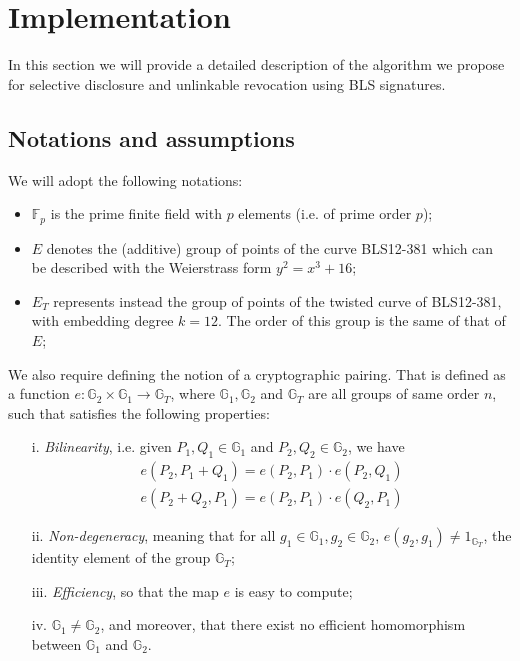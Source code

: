 \section{Implementation}

In this section we will provide a detailed description of the algorithm we propose for selective disclosure and unlinkable revocation using BLS signatures.

\subsection{Notations and assumptions}

We will adopt the following notations:
\begin{itemize}

\item $\mathbb{F}_p$ is the prime finite field with $p$ elements
  (i.e. of prime order $p$);

\item $E$ denotes the (additive) group of points of the curve
  BLS12-381 \cite{bls381-12} which can be described with the
  Weierstrass form $y^2=x^3 + 16$;

\item $E_T$ represents instead the group of points of the twisted
  curve of BLS12-381, with embedding degree $k=12$. The order of
  this group is the same of that of $E$;

\end{itemize}

We also require defining the notion of a cryptographic
pairing. That is defined as a function $e:
\mathbb{G}_2\times\mathbb{G}_1\to \mathbb{G}_T$, where
$\mathbb{G}_1,\mathbb{G}_2$ and $\mathbb{G}_T$ are all groups of same
order $n$, such that satisfies the following properties:

\begin{itemize}

\item [i.] \emph{Bilinearity}, i.e. given $P_1,Q_1\in\mathbb{G}_1$
  and $P_2,Q_2\in\mathbb{G}_2$, we have
  \begin{align*}
    e(P_2,P_1+Q_1) = e(P_2,P_1)\cdot e(P_2,Q_1)   \\
    e(P_2+Q_2,P_1) = e(P_2,P_1)\cdot e(Q_2,P_1)
  \end{align*}

\item[ii.] \emph{Non-degeneracy}, meaning that for all
  $g_1\in\mathbb{G}_1, g_2\in\mathbb{G}_2$, $e(g_2,g_1)\ne
  1_{\mathbb{G}_T}$, the identity element of the group
  $\mathbb{G}_T$;

\item[iii.] \emph{ Efficiency}, so that the map $e$ is easy to
  compute;

\item[iv. ] $\mathbb{G}_1\ne \mathbb{G}_2$, and moreover, that
  there exist no efficient homomorphism between $\mathbb{G}_1$ and
  $\mathbb{G}_2$.

\end{itemize}

